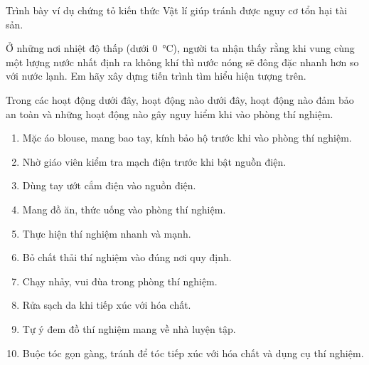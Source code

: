 \begin{ex}
	Trình bày ví dụ chứng tỏ kiến thức Vật lí giúp tránh được nguy cơ tổn hại tài sản.
\end{ex}
\begin{ex}
	Ở những nơi nhiệt độ thấp (dưới \SI{0}{\celsius}), người ta nhận thấy rằng khi vung cùng một lượng nước nhất định ra không khí thì nước nóng sẽ đông đặc nhanh hơn so với nước lạnh. Em hãy xây dựng tiến trình tìm hiểu hiện tượng trên.
\end{ex}
\begin{ex}
	Trong các hoạt động dưới đây, hoạt động nào dưới đây, hoạt động nào đảm bảo an toàn và những hoạt động nào gây nguy hiểm khi vào phòng thí nghiệm.
	\begin{enumerate}[label=\arabic*.]
		\item Mặc áo blouse, mang bao tay, kính bảo hộ trước khi vào phòng thí nghiệm.
		\item Nhờ giáo viên kiểm tra mạch điện trước khi bật nguồn điện.
		\item Dùng tay ướt cắm điện vào nguồn điện.
		\item Mang đồ ăn, thức uống vào phòng thí nghiệm.
		\item Thực hiện thí nghiệm nhanh và mạnh.
		\item Bỏ chất thải thí nghiệm vào đúng nơi quy định.
		\item Chạy nhảy, vui đùa trong phòng thí nghiệm.
		\item Rửa sạch da khi tiếp xúc với hóa chất.
		\item Tự ý đem đồ thí nghiệm mang về nhà luyện tập.
		\item Buộc tóc gọn gàng, tránh để tóc tiếp xúc với hóa chất và dụng cụ thí nghiệm.
	\end{enumerate}
\end{ex}
